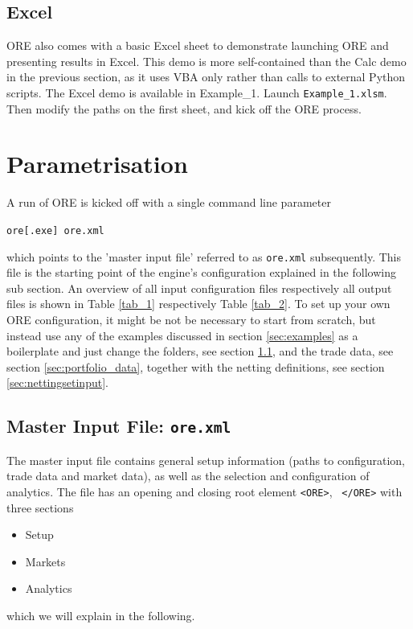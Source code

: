 \documentclass[12pt, a4paper]{article}
\begin{document}

\subsection{Excel}\label{sec:excel}

ORE also comes with a basic Excel sheet to demonstrate launching ORE and presenting results in Excel. This demo is more
self-contained than the Calc demo in the previous section, as it uses VBA only rather than calls to external Python
scripts. The Excel demo is available in Example\_1. Launch {\tt Example\_1.xlsm}. Then modify the paths on the first
sheet, and kick off the ORE process.

\section{Parametrisation}\label{sec:configuration}

A run of ORE is kicked off with a single command line parameter 

\medskip
\centerline{\tt ore[.exe] ore.xml}
\medskip

which points to the 'master input file' referred to  as {\tt ore.xml} subsequently. 
This file is the starting point of the engine's configuration explained in the following sub section.
An overview of all input configuration files respectively all output files is shown in Table \ref{tab_1} respectively Table \ref{tab_2}.
To set up your own ORE configuration, it might be not be necessary to start from scratch, but instead use any of the examples discussed in section \ref{sec:examples} as a boilerplate and just change the folders, see section \ref{sec:master_input}, and the trade data, see section \ref{sec:portfolio_data}, together with the netting definitions, see section \ref{sec:nettingsetinput}.

\subsection{Master Input File: {\tt ore.xml}}\label{sec:master_input}

The master input file contains general setup information (paths to configuration, trade data and market data), as well
as the selection and configuration of analytics. The file has an opening and closing root element {\tt <ORE>}, {\tt
  </ORE>} with three sections
\begin{itemize}
\item Setup
\item Markets
\item Analytics
\end{itemize}
which we will explain in the following.
\end{document}
